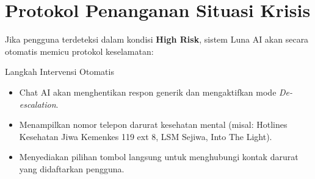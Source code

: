 \section{Protokol Penanganan Situasi Krisis}
Jika pengguna terdeteksi dalam kondisi \textbf{High Risk}, sistem Luna AI akan secara otomatis memicu protokol keselamatan:


\begin{lunacallout}{Langkah Intervensi Otomatis}
\begin{itemize}
    \item Chat AI akan menghentikan respon generik dan mengaktifkan mode \textit{De-escalation}.
    \item Menampilkan nomor telepon darurat kesehatan mental (misal: Hotlines Kesehatan Jiwa Kemenkes 119 ext 8, LSM Sejiwa, Into The Light).
    \item Menyediakan pilihan tombol langsung untuk menghubungi kontak darurat yang didaftarkan pengguna.
\end{itemize}
\end{lunacallout}
